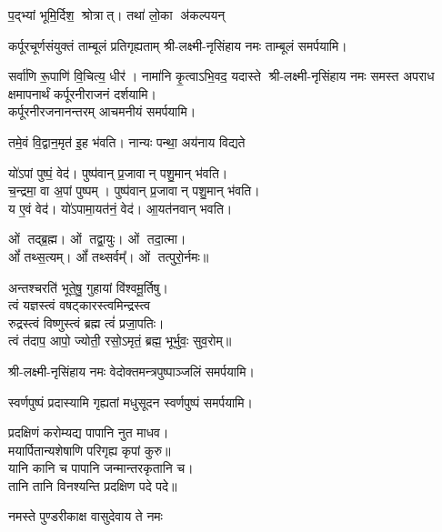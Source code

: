 \begin{center}
{प॒द्भ्यां भूमि॒र्दिश॒ श्रोत्रात्। तथा॑ लो॒का अ॑कल्पयन्}

{कर्पूरचूर्णसंयुक्तं ताम्बूलं प्रतिगृह्यताम्}
श्री-लक्ष्मी-नृसिंहाय नमः ताम्बूलं समर्पयामि।\medskip

{सर्वा॑णि रू॒पाणि॑ वि॒चित्य॒ धीर॑। नामा॑नि कृ॒त्वाऽभि॒वद॒\an{} यदास्ते}
श्री-लक्ष्मी-नृसिंहाय नमः समस्त अपराध क्षमापनार्थं कर्पूरनीराजनं दर्शयामि।\\
कर्पूरनीरजनानन्तरम् आचमनीयं समर्पयामि।\medskip

 {तमे॒वं वि॒द्वान॒मृत॑ इ॒ह भ॑वति। नान्यः पन्था॒ अय॑नाय विद्यते}

 यो॑ऽपां पुष्पं॒ वेद॑। पुष्प॑वान् प्र॒जावान् पशु॒मान् भ॑वति।\\
च॒न्द्रमा॒ वा अ॒पां पुष्पम्। पुष्प॑वान् प्र॒जावान् पशु॒मान् भ॑वति।\\
य ए॒वं वेद॑। यो॑ऽपामा॒यत॑नं॒ वेद॑। आ॒यत॑नवान् भवति।\medskip

ओं तद्ब्र॒ह्म। ओं तद्वा॒युः। ओं तदा॒त्मा।\\ ओं᳚ तथ्स॒त्यम्‌।
ओं᳚ तथ्सर्वम्᳚‌। ओं तत्पुरो॒र्नमः॥\medskip

अन्तश्चरति॑ भूते॒षु॒ गुहायां वि॑श्वमू॒र्तिषु। \\
त्वं यज्ञस्त्वं वषट्कारस्त्वमिन्द्रस्त्व\\ रुद्रस्त्वं विष्णुस्त्वं ब्रह्म त्वं॑ प्रजा॒पतिः। \\
त्वं त॑दाप॒ आपो॒ ज्योती॒ रसो॒ऽमृतं॒ ब्रह्म॒ भूर्भुवः॒ सुव॒रोम्‌॥\medskip

\medskip

श्री-लक्ष्मी-नृसिंहाय नमः वेदोक्तमन्त्रपुष्पाञ्जलिं समर्पयामि।\medskip

{स्वर्णपुष्पं प्रदास्यामि गृह्यतां मधुसूदन}
स्वर्णपुष्पं समर्पयामि।\medskip

प्रदक्षिणं करोम्यद्य पापानि नुत माधव।\\
मयार्पितान्यशेषाणि परिगृह्य कृपां कुरु॥\\
 यानि कानि च पापानि जन्मान्तरकृतानि च।\\
तानि तानि विनश्यन्ति प्रदक्षिण पदे पदे॥\medskip

{नमस्ते पुण्डरीकाक्ष वासुदेवाय ते नमः}


\end{center}
